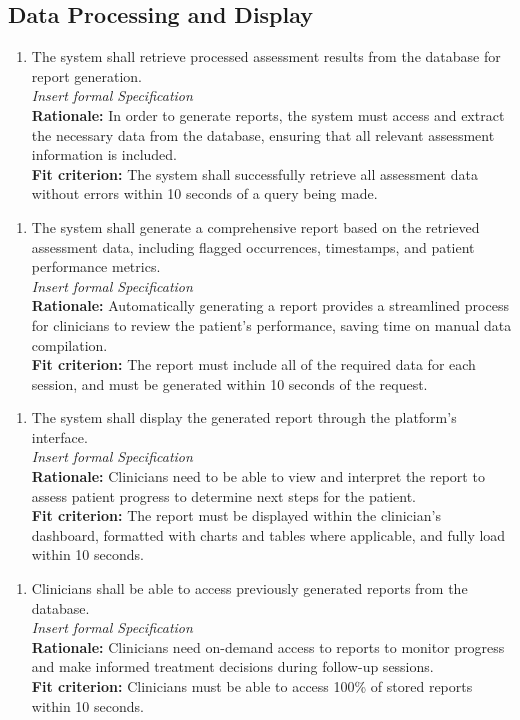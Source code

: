 \documentclass[12pt]{article}
\begin{document}
\subsection{Data Processing and Display}
\begin{enumerate}[{FR-DPD}1. ]
  \item The system shall retrieve processed assessment results from the database for report generation.\\
  \textit{Insert formal Specification}\\
  \textbf{Rationale: }In order to generate reports, the system must access and extract the necessary data from the database, ensuring that all relevant assessment information is included.\\
  \textbf{Fit criterion: }The system shall successfully retrieve all assessment data without errors within 10 seconds of a query being made.
\end{enumerate}
\begin{enumerate}[{FR-DPD}2. ]
  \item The system shall generate a comprehensive report based on the retrieved assessment data, including flagged occurrences, timestamps, and patient performance metrics.\\
  \textit{Insert formal Specification}\\
  \textbf{Rationale: }Automatically generating a report provides a streamlined process for clinicians to review the patient’s performance, saving time on manual data compilation.\\
  \textbf{Fit criterion: }The report must include all of the required data for each session, and must be generated within 10 seconds of the request.
\end{enumerate}
\begin{enumerate}[{FR-DPD}3. ]
  \item The system shall display the generated report through the platform’s interface.\\
  \textit{Insert formal Specification}\\
  \textbf{Rationale: }Clinicians need to be able to view and interpret the report to assess patient progress to determine next steps for the patient.\\
  \textbf{Fit criterion: }The report must be displayed within the clinician's dashboard, formatted with charts and tables where applicable, and fully load within 10 seconds.
\end{enumerate}
\begin{enumerate}[{FR-DPD}4. ]
  \item Clinicians shall be able to access previously generated reports from the database.\\
  \textit{Insert formal Specification}\\
  \textbf{Rationale: }Clinicians need on-demand access to reports to monitor progress and make informed treatment decisions during follow-up sessions.\\
  \textbf{Fit criterion: }Clinicians must be able to access 100\% of stored reports within 10 seconds.  
\end{enumerate}
\end{document}

